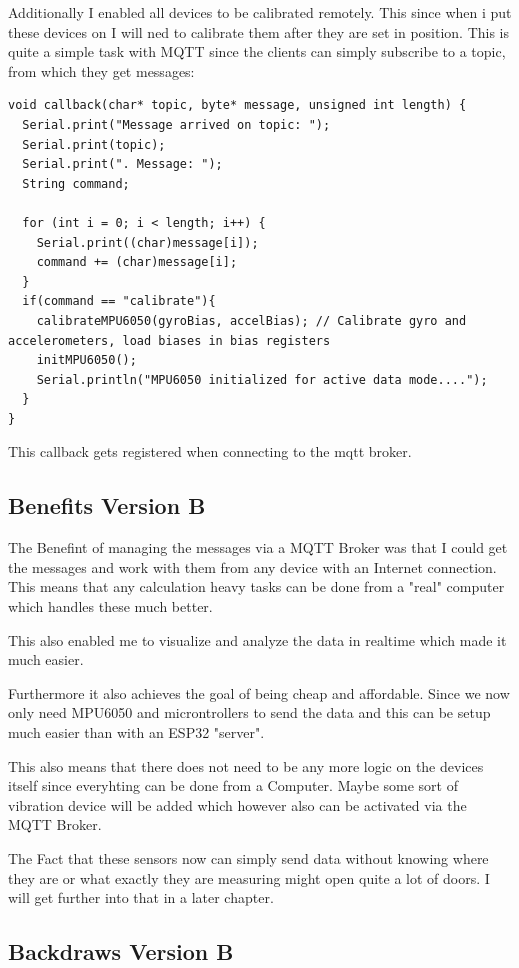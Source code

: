 Additionally I enabled all devices to be calibrated remotely. This since when i put these devices on I will ned to calibrate them after they are set in position. This is quite a simple task with MQTT since the clients can simply subscribe to a topic, from which they get messages: 

\begin{lstlisting}
void callback(char* topic, byte* message, unsigned int length) {
  Serial.print("Message arrived on topic: ");
  Serial.print(topic);
  Serial.print(". Message: ");
  String command;
  
  for (int i = 0; i < length; i++) {
    Serial.print((char)message[i]);
    command += (char)message[i];
  }
  if(command == "calibrate"){
    calibrateMPU6050(gyroBias, accelBias); // Calibrate gyro and accelerometers, load biases in bias registers  
    initMPU6050(); 
    Serial.println("MPU6050 initialized for active data mode....");
  }
}
\end{lstlisting}
This callback gets registered when connecting to the mqtt broker.



\subsection{Benefits Version B}

The Benefint of managing the messages via a MQTT Broker was that I could get the messages and work with them from any device with an Internet connection. This means that any calculation heavy tasks can be done from a "real" computer which handles these much better. 

This also enabled me to visualize and analyze the data in realtime which made it much easier. 

Furthermore it also achieves the goal of being cheap and affordable. Since we now only need MPU6050 and microntrollers to send the data and this can be setup much easier than with an ESP32 "server".

This also means that there does not need to be any more logic on the devices itself since everyhting can be done from a Computer. Maybe some sort of vibration device will be added which however also can be activated via the MQTT Broker. 

The Fact that these sensors now can simply send data without knowing where they are or what exactly they are measuring might open quite a lot of doors. I will get further into that in a later chapter.

\subsection{Backdraws Version B}

